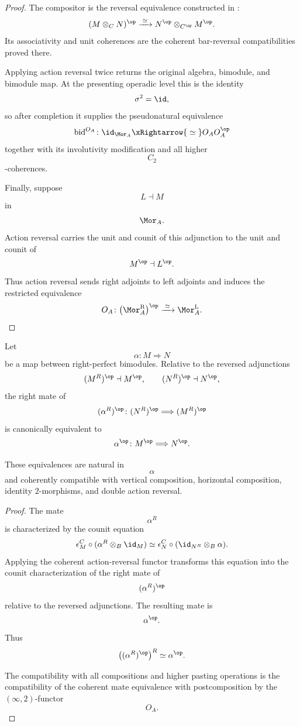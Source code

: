 \begin{proof}
The compositor is the reversal equivalence constructed in
:
\[
    (M\otimes_C N)^{\op}
    \xrightarrow{\;\simeq\;}
    N^{\op}
    \otimes_{C^{\op}}
    M^{\op}.
\]
Its associativity and unit coherences are the coherent bar-reversal
compatibilities proved there.

Applying action reversal twice returns the original algebra, bimodule,
and bimodule map. At the presenting operadic level this is the identity
\[
    \sigma^2=\id,
\]
so after completion it supplies the pseudonatural equivalence
\[
    \operatorname{bid}^{O_A}
    \colon
    \id_{\Mor_A}
    \xRightarrow{\;\simeq\;}
    O_AO_A^{\op}
\]
together with its involutivity modification and all higher
\[
    C_2
\]
-coherences.

Finally, suppose
\[
    L\dashv M
\]
in
\[
    \Mor_A.
\]
Action reversal carries the unit and counit of this adjunction to the
unit and counit of
\[
    M^{\op}
    \dashv
    L^{\op}.
\]
Thus action reversal sends right adjoints to left adjoints and induces
the restricted equivalence
\[
    O_A
    \colon
    \bigl(
        \Mor_A^{\mathrm R}
    \bigr)^{\op}
    \xrightarrow{\;\simeq\;}
    \Mor_A^{\mathrm L}.
\]
\end{proof}

\begin{lemma}
\label{lem:mate-reversed-mate}
Let
\[
    \alpha
    \colon
    M
    \Longrightarrow
    N
\]
be a map between right-perfect bimodules. Relative to the reversed
adjunctions
\[
    (M^R)^{\op}
    \dashv
    M^{\op},
    \qquad
    (N^R)^{\op}
    \dashv
    N^{\op},
\]
the right mate of
\[
    (\alpha^R)^{\op}
    \colon
    (N^R)^{\op}
    \Longrightarrow
    (M^R)^{\op}
\]
is canonically equivalent to
\[
    \alpha^{\op}
    \colon
    M^{\op}
    \Longrightarrow
    N^{\op}.
\]

These equivalences are natural in
\[
    \alpha
\]
and coherently compatible with vertical composition, horizontal
composition, identity $2$-morphisms, and double action reversal.
\end{lemma}

\begin{proof}
The mate
\[
    \alpha^R
\]
is characterized by the counit equation
\[
    \epsilon_M^{C}
    \circ
    (\alpha^R\otimes_B\id_M)
    \simeq
    \epsilon_N^{C}
    \circ
    (\id_{N^R}\otimes_B\alpha).
\]
Applying the coherent action-reversal functor transforms this equation
into the counit characterization of the right mate of
\[
    (\alpha^R)^{\op}
\]
relative to the reversed adjunctions. The resulting mate is
\[
    \alpha^{\op}.
\]
Thus
\[
    \left(
        (\alpha^R)^{\op}
    \right)^R
    \simeq
    \alpha^{\op}.
\]

The compatibility with all compositions and higher pasting operations is
the compatibility of the coherent mate equivalence with postcomposition
by the $(\infty,2)$-functor
\[
    O_A.
\]
\end{proof}

